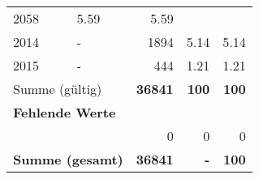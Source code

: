\begin{longtable}{lXrrr}
       \num{2058} &
       \num[round-mode=places,round-precision=2]{5,59} &
         \num[round-mode=places,round-precision=2]{5,59} \\

     2014 &
     \multicolumn{1}{X}{ -  } &


       \num{1894} &
       \num[round-mode=places,round-precision=2]{5,14} &
         \num[round-mode=places,round-precision=2]{5,14} \\

     2015 &
     \multicolumn{1}{X}{ -  } &


       \num{444} &
       \num[round-mode=places,round-precision=2]{1,21} &
         \num[round-mode=places,round-precision=2]{1,21} \\
     \midrule
     \multicolumn{2}{l}{Summe (gültig)} &
       \textbf{\num{36841}} &
     \textbf{100} &
       \textbf{\num[round-mode=places,round-precision=2]{100}} \\
     \multicolumn{5}{l}{\textbf{Fehlende Werte}}\\
      & & 0 & 0 & 0 \\
     \midrule
     \multicolumn{2}{l}{\textbf{Summe (gesamt)}} &
          \textbf{\num{36841}} &
        \textbf{-} &
        \textbf{100} \\
     \bottomrule
     \end{longtable}
     
